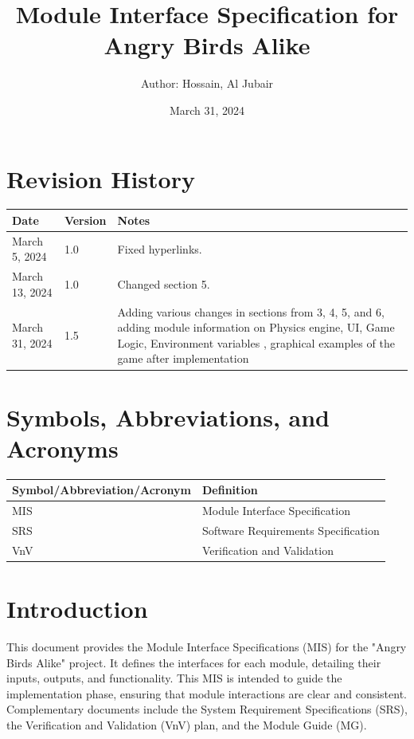 \documentclass[12pt]{article}
\title{Module Interface Specification for Angry Birds Alike}
\author{Author: Hossain, Al Jubair}
\date{March 31, 2024}
\begin{document}
\maketitle

\newpage

\section*{Revision History}
\begin{longtable}{|p{2cm}|p{2cm}|p{10cm}|}
    \hline
    \textbf{Date} & \textbf{Version} & \textbf{Notes} \\
    \hline
    March 5, 2024 & 1.0 & Fixed hyperlinks.\\
    March 13, 2024 & 1.0 & Changed section 5.\\
    \hline
    March 31, 2024 & 1.5 & Adding various changes in sections from 3, 4, 5, and 6, adding module information on Physics engine, UI, Game Logic, Environment variables , graphical examples of the game after implementation \\
    \hline
\end{longtable}

\newpage

\tableofcontents

\newpage

\section{Symbols, Abbreviations, and Acronyms}
\begin{longtable}{|l|l|}
    \hline
    \textbf{Symbol/Abbreviation/Acronym} & \textbf{Definition} \\
    \hline
    MIS & Module Interface Specification \\
    SRS & Software Requirements Specification \\
    VnV & Verification and Validation \\
    \hline
\end{longtable}
\section{Introduction}
This document provides the Module Interface Specifications (MIS) for the "Angry Birds Alike" project. It defines the interfaces for each module, detailing their inputs, outputs, and functionality. This MIS is intended to guide the implementation phase, ensuring that module interactions are clear and consistent. Complementary documents include the System Requirement Specifications (SRS), the Verification and Validation (VnV) plan, and the Module Guide (MG).
\end{document}
